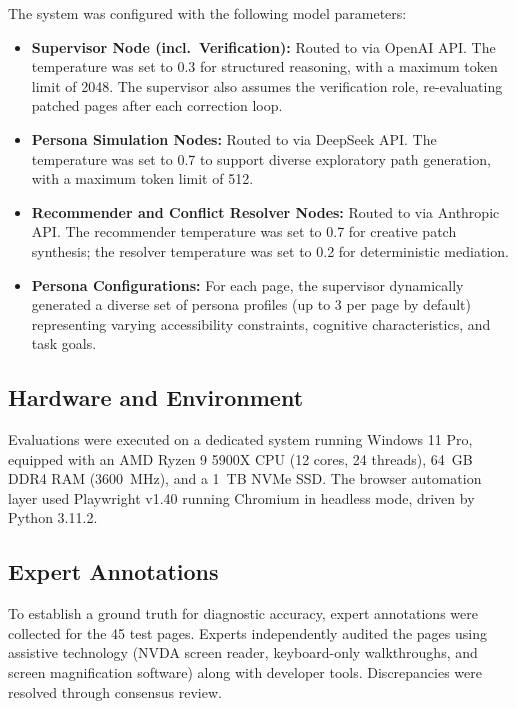 The system was configured with the following model parameters:
\begin{itemize}
    \item \textbf{Supervisor Node (incl.\ Verification):} Routed to  via OpenAI API. The temperature was set to 0.3 for structured reasoning, with a maximum token limit of 2048. The supervisor also assumes the verification role, re-evaluating patched pages after each correction loop.
    \item \textbf{Persona Simulation Nodes:} Routed to  via DeepSeek API. The temperature was set to 0.7 to support diverse exploratory path generation, with a maximum token limit of 512.
    \item \textbf{Recommender and Conflict Resolver Nodes:} Routed to  via Anthropic API. The recommender temperature was set to 0.7 for creative patch synthesis; the resolver temperature was set to 0.2 for deterministic mediation.
    \item \textbf{Persona Configurations:} For each page, the supervisor dynamically generated a diverse set of persona profiles (up to 3 per page by default) representing varying accessibility constraints, cognitive characteristics, and task goals.
\end{itemize}

\subsection{Hardware and Environment}
\label{sec:hardware-env}

Evaluations were executed on a dedicated system running Windows 11 Pro, equipped with an AMD Ryzen 9 5900X CPU (12 cores, 24 threads), 64~GB DDR4 RAM (3600~MHz), and a 1~TB NVMe SSD. The browser automation layer used Playwright v1.40 running Chromium in headless mode, driven by Python 3.11.2.

\subsection{Expert Annotations}
\label{sec:expert-annotations}

To establish a ground truth for diagnostic accuracy, expert annotations were collected for the 45 test pages. Experts independently audited the pages using assistive technology (NVDA screen reader, keyboard-only walkthroughs, and screen magnification software) along with developer tools. Discrepancies were resolved through consensus review.


